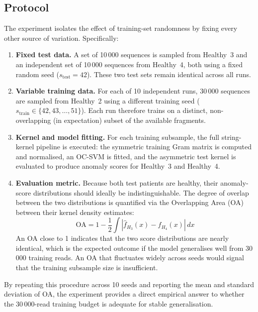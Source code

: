 \subsection{Protocol}\label{sec:seed-protocol}

The experiment isolates the effect of training-set randomness by fixing every other source of variation.
Specifically:

\begin{enumerate}
    \item \textbf{Fixed test data.}
    A set of 10\,000 sequences is sampled from Healthy~3 and an independent set of 10\,000 sequences from Healthy~4, both using a fixed random seed ($s_{\text{test}} = 42$).
    These two test sets remain identical across all runs.

    \item \textbf{Variable training data.}
    For each of 10 independent runs, 30\,000 sequences are sampled from Healthy~2 using a different training seed ($s_{\text{train}} \in \{42, 43, \ldots, 51\}$).
    Each run therefore trains on a distinct, non-overlapping (in expectation) subset of the available fragments.

    \item \textbf{Kernel and model fitting.}
    For each training subsample, the full string-kernel pipeline is executed: the symmetric training Gram matrix is computed and normalised, an OC-SVM is fitted, and the asymmetric test kernel is evaluated to produce anomaly scores for Healthy~3 and Healthy~4.

    \item \textbf{Evaluation metric.}
    Because both test patients are healthy, their anomaly-score distributions should ideally be indistinguishable.
    The degree of overlap between the two distributions is quantified via the Overlapping Area (OA) between their kernel density estimates:
    \begin{equation}\label{eq:oa}
        \text{OA} = 1 - \frac{1}{2} \int \left| \hat{f}_{H_3}(x) - \hat{f}_{H_4}(x) \right| \, dx
    \end{equation}
    An OA close to 1 indicates that the two score distributions are nearly identical, which is the expected outcome if the model generalises well from 30\,000 training reads.
    An OA that fluctuates widely across seeds would signal that the training subsample size is insufficient.
\end{enumerate}

By repeating this procedure across 10 seeds and reporting the mean and standard deviation of OA, the experiment provides a direct empirical answer to whether the 30\,000-read training budget is adequate for stable generalisation.

